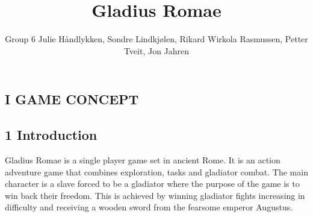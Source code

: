\documentclass{article}
\title{Gladius Romae}
\author{ Group 6
Julie Håndlykken, Sondre Lindkjølen, Rikard Wirkola Rasmussen, Petter Tveit, Jon Jahren
}
\begin{document}
\begin{titlepage}

\tableofcontents
























\section{
I GAME CONCEPT
}
\subsection{ 1 Introduction }
Gladius Romae is a single player game set in ancient Rome. It is an action adventure game that combines exploration, tasks and gladiator combat. The main character is a slave forced to be a gladiator where the purpose of the game is to win back their freedom. This is achieved by winning gladiator fights increasing in difficulty and receiving a wooden sword from the fearsome emperor Augustus.


\end{titlepage}
\end{document}
